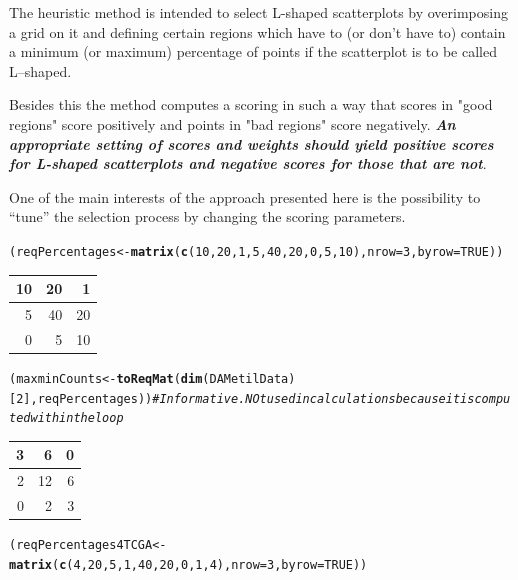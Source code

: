 \documentclass[a4paper,10pt]{article}\usepackage[]{graphicx}\usepackage[]{color}
\makeatletter
\newcommand{\hlnum}[1]{\textcolor[rgb]{0.686,0.059,0.569}{#1}}%
\newcommand{\hlcom}[1]{\textcolor[rgb]{0.678,0.584,0.686}{\textit{#1}}}%
\newcommand{\hlstd}[1]{\textcolor[rgb]{0.345,0.345,0.345}{#1}}%
\newcommand{\hlkwb}[1]{\textcolor[rgb]{0.69,0.353,0.396}{#1}}%
\newcommand{\hlkwc}[1]{\textcolor[rgb]{0.333,0.667,0.333}{#1}}%
\newcommand{\hlkwd}[1]{\textcolor[rgb]{0.737,0.353,0.396}{\textbf{#1}}}%
\newenvironment{kframe}{%
 \def\at@end@of@kframe{}%
 \ifinner\ifhmode%
  \def\at@end@of@kframe{\end{minipage}}%
  \begin{minipage}{\columnwidth}%
 \fi\fi%
 \def\FrameCommand##1{\hskip\@totalleftmargin \hskip-\fboxsep
 \colorbox{shadecolor}{##1}\hskip-\fboxsep
     \hskip-\linewidth \hskip-\@totalleftmargin \hskip\columnwidth}%
 \MakeFramed {\advance\hsize-\width
   \@totalleftmargin\z@ \linewidth\hsize
   \@setminipage}}%
 {\par\unskip\endMakeFramed%
 \at@end@of@kframe}
\newenvironment{knitrout}{}{} %
\makeatother
\begin{document}
The heuristic method is intended to select L-shaped scatterplots by overimposing a grid on it and defining certain regions which have to (or don't have to) contain a minimum (or maximum) percentage of points if the scatterplot is to be called L--shaped.

Besides this the method computes a scoring in such a way that scores in "good regions" score positively and points in "bad regions" score negatively. \emph{\textbf{An appropriate setting of scores and weights should yield positive scores for L-shaped scatterplots and negative scores for those that are not}}. 

One of the main interests of the approach presented here is the possibility to ``tune'' the selection process by changing the scoring parameters.

\begin{knitrout}
\color{fgcolor}\begin{kframe}
\begin{alltt}
\hlstd{(reqPercentages}   \hlkwb{<-} \hlkwd{matrix} \hlstd{(}\hlkwd{c}\hlstd{(}\hlnum{10}\hlstd{,} \hlnum{20}\hlstd{,} \hlnum{1}\hlstd{,} \hlnum{5}\hlstd{,} \hlnum{40}\hlstd{,} \hlnum{20}\hlstd{,} \hlnum{0}\hlstd{,} \hlnum{5}\hlstd{,} \hlnum{10}\hlstd{),} \hlkwc{nrow}\hlstd{=}\hlnum{3}\hlstd{,} \hlkwc{byrow}\hlstd{=}\hlnum{TRUE}\hlstd{))}
\end{alltt}
\end{kframe}


\begin{tabular}{r|r|r}
\hline
10 & 20 & 1\\
\hline
5 & 40 & 20\\
\hline
0 & 5 & 10\\
\hline
\end{tabular}\begin{kframe}\begin{alltt}
\hlstd{(maxminCounts} \hlkwb{<-} \hlkwd{toReqMat}\hlstd{(}\hlkwd{dim}\hlstd{(DAMetilData)[}\hlnum{2}\hlstd{], reqPercentages))} \hlcom{# Informative. NOt used in calculations because it is computed within the loop}
\end{alltt}
\end{kframe}


\begin{tabular}{r|r|r}
\hline
3 & 6 & 0\\
\hline
2 & 12 & 6\\
\hline
0 & 2 & 3\\
\hline
\end{tabular}\begin{kframe}\begin{alltt}
\hlstd{(reqPercentages4TCGA} \hlkwb{<-} \hlkwd{matrix} \hlstd{(}\hlkwd{c}\hlstd{(}\hlnum{4}\hlstd{,} \hlnum{20}\hlstd{,} \hlnum{5}\hlstd{,} \hlnum{1}\hlstd{,} \hlnum{40}\hlstd{,} \hlnum{20}\hlstd{,} \hlnum{0}\hlstd{,} \hlnum{1}\hlstd{,} \hlnum{4}\hlstd{),} \hlkwc{nrow}\hlstd{=}\hlnum{3}\hlstd{,} \hlkwc{byrow}\hlstd{=}\hlnum{TRUE}\hlstd{))}
\end{alltt}
\end{kframe}



\end{knitrout}
\end{document}
